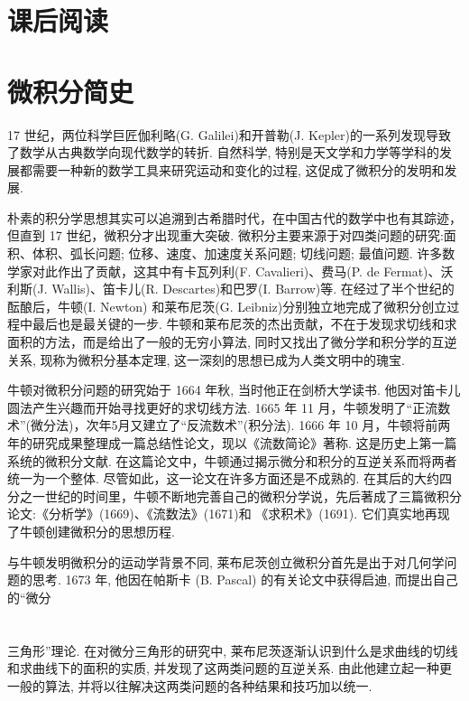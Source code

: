 \documentclass[10pt]{article}
\begin{document}
\section*{课后阅读}

\section*{微积分简史}

17 世纪，两位科学巨匠伽利略(G. Galilei)和开普勒(J. Kepler)的一系列发现导致了数学从古典数学向现代数学的转折. 自然科学, 特别是天文学和力学等学科的发展都需要一种新的数学工具来研究运动和变化的过程, 这促成了微积分的发明和发展.

朴素的积分学思想其实可以追溯到古希腊时代，在中国古代的数学中也有其踪迹，但直到 17 世纪，微积分才出现重大突破. 微积分主要来源于对四类问题的研究:面积、体积、弧长问题; 位移、速度、加速度关系问题; 切线问题; 最值问题. 许多数学家对此作出了贡献，这其中有卡瓦列利(F. Cavalieri)、费马(P. de Fermat)、沃利斯(J. Wallis)、笛卡儿(R. Descartes)和巴罗(I. Barrow)等. 在经过了半个世纪的酝酿后，牛顿(I. Newton) 和莱布尼茨(G. Leibniz)分别独立地完成了微积分创立过程中最后也是最关键的一步. 牛顿和莱布尼茨的杰出贡献，不在于发现求切线和求面积的方法，而是给出了一般的无穷小算法, 同时又找出了微分学和积分学的互逆关系, 现称为微积分基本定理, 这一深刻的思想已成为人类文明中的瑰宝.

牛顿对微积分问题的研究始于 1664 年秋, 当时他正在剑桥大学读书. 他因对笛卡儿圆法产生兴趣而开始寻找更好的求切线方法. 1665 年 11 月，牛顿发明了“正流数术”(微分法)，次年5月又建立了“反流数术”(积分法). 1666 年 10 月，牛顿将前两年的研究成果整理成一篇总结性论文，现以《流数简论》著称. 这是历史上第一篇系统的微积分文献. 在这篇论文中，牛顿通过揭示微分和积分的互逆关系而将两者统一为一个整体. 尽管如此，这一论文在许多方面还是不成熟的. 在其后的大约四分之一世纪的时间里，牛顿不断地完善自己的微积分学说，先后著成了三篇微积分论文:《分析学》(1669)、《流数法》(1671)和 《求积术》(1691). 它们真实地再现了牛顿创建微积分的思想历程.

与牛顿发明微积分的运动学背景不同, 莱布尼茨创立微积分首先是出于对几何学问题的思考. 1673 年, 他因在帕斯卡 (B. Pascal) 的有关论文中获得启迪, 而提出自己的“微分

\section*{}

三角形”理论. 在对微分三角形的研究中, 莱布尼茨逐渐认识到什么是求曲线的切线和求曲线下的面积的实质, 并发现了这两类问题的互逆关系. 由此他建立起一种更一般的算法, 并将以往解决这两类问题的各种结果和技巧加以统一.
\end{document}
